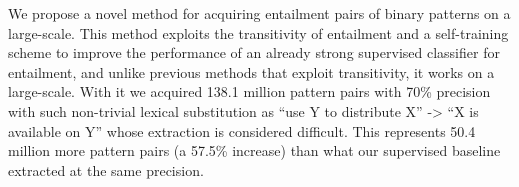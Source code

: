We propose a novel method for acquiring entailment pairs of binary patterns on a large-scale. This method exploits the transitivity of entailment and a self-training scheme to improve the performance of an already strong supervised classifier for entailment, and unlike previous methods that exploit transitivity, it works on a large-scale. With it we acquired 138.1 million pattern pairs with 70\% precision with such non-trivial lexical substitution as ``use Y to distribute X'' -> ``X is available on Y'' whose extraction is considered difficult. This represents 50.4 million more pattern pairs (a 57.5\% increase) than what our supervised baseline extracted at the same precision.
